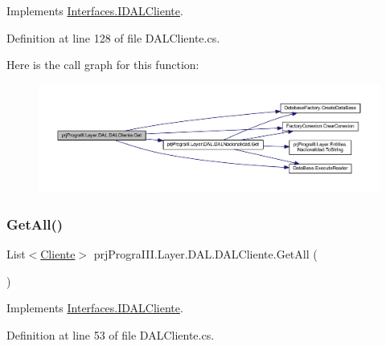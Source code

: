 Implements \hyperlink{interface_interfaces_1_1_i_d_a_l_cliente_a73ffe691596e644e3b87f7685dc19e42}{Interfaces.\+I\+D\+A\+L\+Cliente}.



Definition at line 128 of file D\+A\+L\+Cliente.\+cs.

Here is the call graph for this function\+:
\nopagebreak
\begin{figure}[H]
\begin{center}
\leavevmode
\includegraphics[width=350pt]{classprj_progra_i_i_i_1_1_layer_1_1_d_a_l_1_1_d_a_l_cliente_a4012b382e3da25b5300a46f05a81efb3_cgraph}
\end{center}
\end{figure}
\hypertarget{classprj_progra_i_i_i_1_1_layer_1_1_d_a_l_1_1_d_a_l_cliente_a7c513194970afd18572e1b93bb8ba4d9}{}\label{classprj_progra_i_i_i_1_1_layer_1_1_d_a_l_1_1_d_a_l_cliente_a7c513194970afd18572e1b93bb8ba4d9} 
\subsubsection{\texorpdfstring{Get\+All()}{GetAll()}}
{\footnotesize\ttfamily List$<$\hyperlink{classprj_progra_i_i_i_1_1_layer_1_1_entities_1_1_cliente}{Cliente}$>$ prj\+Progra\+I\+I\+I.\+Layer.\+D\+A\+L.\+D\+A\+L\+Cliente.\+Get\+All (\begin{DoxyParamCaption}{ }\end{DoxyParamCaption})}



Implements \hyperlink{interface_interfaces_1_1_i_d_a_l_cliente_ac6adab4e78fae5e2bb08bff403d83fe7}{Interfaces.\+I\+D\+A\+L\+Cliente}.



Definition at line 53 of file D\+A\+L\+Cliente.\+cs.

